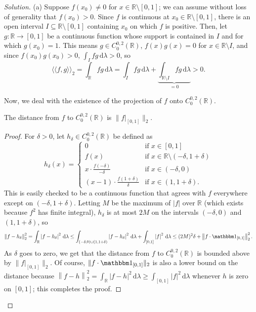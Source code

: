 \documentclass[10pt]{article}
\newcommand{\dd}{\,\mathrm{d}}
\providecommand{\RR}{\mathbb R}
\providecommand{\ind}{\mathbbm 1}
\newenvironment{soln}{\begin{proof}[Solution]}{\end{proof}}
\providecommand{\abs}[1]{\left\lvert #1\right\rvert}
\providecommand{\innerprod}[1]{\langle\!\langle #1\rangle\!\rangle}
\providecommand{\norm}[1]{\left\| #1\right\|}
\providecommand{\smnorm}[1]{\| #1\|}
\begin{document}
\begin{soln}
    (a) Suppose $f(x_0)\ne 0$ for $x\in\RR\setminus[0,1]$;
    we can assume without loss of generality that $f(x_0) > 0$.
    Since $f$ is continuous at $x_0\in\RR\setminus[0,1]$,
    there is an open interval $I\subseteq\RR\setminus[0,1]$ containing $x_0$
    on which $f$ is positive.
    Then, let $g\colon\RR\to[0,1]$ be a continuous function
    whose support is contained in $I$ and for which $g(x_0) = 1$.
    This means $g\in C_0^{0,2}(\RR)$, $f(x)g(x) = 0$ for $x\in\RR\setminus I$,
    and since $f(x_0)g(x_0) > 0$, $\int_I fg\dd\lambda > 0$, so
    \begin{equation*}
	\innerprod{f,g}_2 = \int_{\RR} fg\dd\lambda
	= \int_I fg\dd\lambda +
	\underbrace{\int_{\RR\setminus I}fg\dd\lambda}_{=0}> 0.
    \end{equation*}

    Now, we deal with the existence of the projection of $f$ onto $C_0^{0,2}(\RR)$.
    \begin{lemma}
	The distance from $f$ to $C_0^{0,2}(\RR)$ is $\smnorm{f|_{[0,1]}}_2$.
    \end{lemma}
    \begin{proof}
	For $\delta>0$, let $h_\delta\in C_0^{0,2}(\RR)$ be defined as
	\begin{equation*}
	    h_\delta(x) = \begin{cases}
		0 & \text{if }x\in[0,1]\\
		f(x) & \text{if }x\in\RR\setminus(-\delta,1+\delta)\\
		x\cdot \frac{f(-\delta)}{-\delta} & \text{if }x\in(-\delta,0)\\
		(x-1)\cdot \frac{f(1+\delta)}{\delta} & \text{if }x\in(1,1+\delta).
	    \end{cases}
	\end{equation*}
	This is easily checked to be a continuous function
	that agrees with $f$ everywhere except on $(-\delta,1+\delta)$.
	Letting $M$ be the maximum of $\abs f$ over $\RR$
	(which exists because $f^2$ has finite integral),
	$h_\delta$ is at most $2M$ on the intervals
	$(-\delta,0)$ and $(1,1+\delta)$, so
	\begin{equation*}
	    \norm{f-h_\delta}_2^2 =
	    \int_\RR\abs{f-h_\delta}^2\dd\lambda
	    \le \int_{(-\delta,0)\cup(1,1+\delta)} \abs{f-h_\delta}^2\dd\lambda
	    + \int_{[0,1]} \abs{f}^2\dd\lambda
	    \le (2M)^2\delta + \norm{f\cdot\ind_{[0,1]}}_2^2.
	\end{equation*}
	As $\delta$ goes to zero, we get that the distance from $f$ to
	$C_0^{0,2}(\RR)$ is bounded above by $\smnorm{f|_{[0,1]}}_2$.
	Of course, $\smnorm{f\cdot\ind_{[0,1]}}_2$ is also a lower bound
	on the distance because
	$\norm{f-h}_2^2 = \int_\RR\abs{f-h}^2\dd\lambda
	\ge \int_{[0,1]} \abs{f}^2\dd\lambda$
	whenever $h$ is zero on $[0,1]$; this completes the proof.
    \end{proof}


\end{soln}
\end{document}
